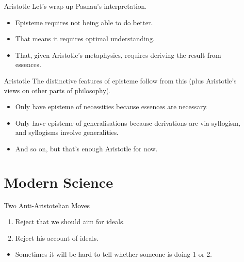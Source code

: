 \documentclass[
  17pt,
  letterpaper,
  ignorenonframetext,
  aspectratio=169,
]{beamer}
\providecommand{\tightlist}{%
  \setlength{\itemsep}{0pt}\setlength{\parskip}{0pt}}\usepackage{longtable,booktabs,array}
\begin{document}
\begin{frame}{Aristotle}
\protect\hypertarget{aristotle-2}{}
Let's wrap up Pasnau's interpretation.

\begin{itemize}[<+->]
\tightlist
\item
  Episteme requires not being able to do better.
\item
  That means it requires optimal understanding.
\item
  That, given Aristotle's metaphysics, requires deriving the result from
  essences.
\end{itemize}
\end{frame}

\begin{frame}{Aristotle}
\protect\hypertarget{aristotle-3}{}
The distinctive features of episteme follow from this (plus Aristotle's
views on other parts of philosophy).

\begin{itemize}[<+->]
\tightlist
\item
  Only have episteme of necessities because essences are necessary.
\item
  Only have episteme of generalisations because derivations are via
  syllogism, and syllogisms involve generalities.
\item
  And so on, but that's enough Aristotle for now.
\end{itemize}
\end{frame}

\hypertarget{modern-science}{%
\section{Modern Science}\label{modern-science}}

\begin{frame}{Two Anti-Aristotelian Moves}
\protect\hypertarget{two-anti-aristotelian-moves}{}
\begin{enumerate}[<+->]
\tightlist
\item
  Reject that we should aim for ideals.
\item
  Reject his account of ideals.
\end{enumerate}

\begin{itemize}[<+->]
\tightlist
\item
  Sometimes it will be hard to tell whether someone is doing 1 or 2.
\end{itemize}
\end{frame}
\end{document}

